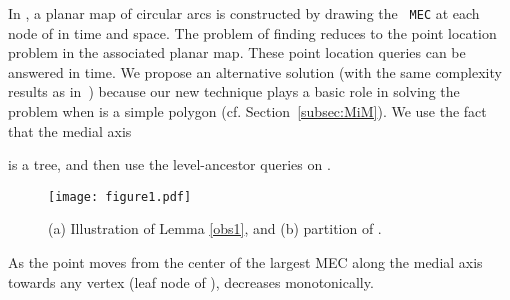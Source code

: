 \documentclass[12pt]{llncs}
\begin{document}
In \cite{BCOY01}, a planar map of circular arcs is constructed by drawing the {\tt 
MEC} at 
each node of  in  time and space.
The problem of finding  reduces to the point location problem in
the associated planar map.  These point location queries can be answered in   
time. We propose an 
alternative solution (with the same complexity results as in\ \cite{BCOY01})  because our new technique plays a basic role in solving 
the problem when  is a simple 
polygon (cf.  Section\ \ref{subsec:MiM}). We use the fact that the medial 
axis 

is a tree, and then use the level-ancestor queries \cite{BF04} on . \begin{figure}
[thb]
\centering  
\texttt{[image: figure1.pdf]}
  \caption{(a) Illustration of Lemma \ref{obs1}, and  (b)
partition of .}
  \label{fig:figure1}
\end{figure}

\begin{lemma}\cite{BCOY01} \label{obs1}
As the point  moves from the center  of the largest MEC  along the medial axis 
towards any
vertex  (leaf node of ),  decreases
monotonically.
\end{lemma}
\end{document}
